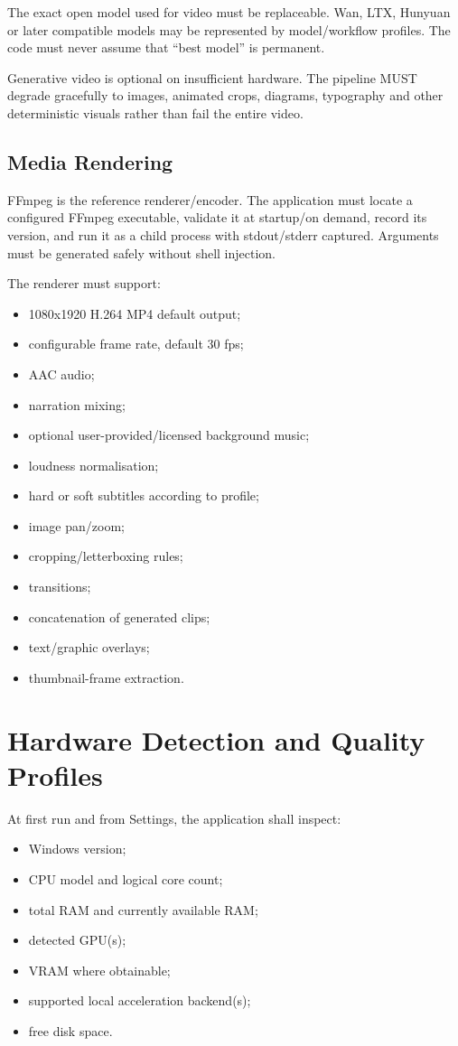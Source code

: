 \documentclass[10pt,journal,compsoc]{IEEEtran}
\begin{document}
The exact open model used for video must be replaceable. Wan, LTX, Hunyuan or later compatible models may be represented by model/workflow profiles. The code must never assume that ``best model'' is permanent.

Generative video is optional on insufficient hardware. The pipeline MUST degrade gracefully to images, animated crops, diagrams, typography and other deterministic visuals rather than fail the entire video.

\subsection{Media Rendering}

FFmpeg is the reference renderer/encoder. The application must locate a configured FFmpeg executable, validate it at startup/on demand, record its version, and run it as a child process with stdout/stderr captured. Arguments must be generated safely without shell injection.

The renderer must support:
\begin{itemize}
    \item 1080x1920 H.264 MP4 default output;
    \item configurable frame rate, default 30 fps;
    \item AAC audio;
    \item narration mixing;
    \item optional user-provided/licensed background music;
    \item loudness normalisation;
    \item hard or soft subtitles according to profile;
    \item image pan/zoom;
    \item cropping/letterboxing rules;
    \item transitions;
    \item concatenation of generated clips;
    \item text/graphic overlays;
    \item thumbnail-frame extraction.
\end{itemize}

\section{Hardware Detection and Quality Profiles}

At first run and from Settings, the application shall inspect:
\begin{itemize}
    \item Windows version;
    \item CPU model and logical core count;
    \item total RAM and currently available RAM;
    \item detected GPU(s);
    \item VRAM where obtainable;
    \item supported local acceleration backend(s);
    \item free disk space.
\end{itemize}
\end{document}
